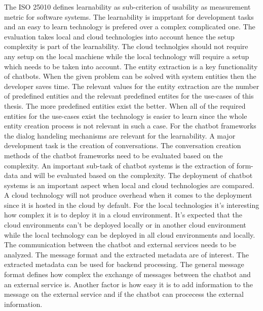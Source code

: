 The ISO 25010\cite{iso25010} defines learnability as sub-criterion of usability as measurement
metric for software systems.
The learnability is impprtant for development tasks and an easy to learn 
technology is prefered over a complex complicated one.
The evaluation takes local and cloud technologies into account hence the 
setup complexity is part of the learnability.
The cloud technolgies should not require any setup on the local machiene while 
the local technology will require a setup which needs to be taken into account.
The entity extraction is a key functionality of chatbots.
When the given problem can be solved with system entities then the developer
saves time.
The relevant values for the entity extraction are the number of predefined entities and 
the relevant predefined entites for the use-cases of this thesis.
The more predefined entities exist the better.
When all of the required entities for the use-cases exist the 
technology is easier to learn since the whole entity creation process is not 
relevant in such a case.
For the chatbot frameworks the dialog handeling mechanisms are relevant for the learnability.
A major development task is the creation of conversations.
The conversation creation methods of the chatbot frameworks need to be evaluated based on the 
complexity.
An important sub-task of chatbot systems is the extraction of form-data and will be evaluated based 
on the complexity.
The deployment of chatbot systems is an important aspect when local and cloud technologies are 
compared.
A cloud technology will not produce overhead when it comes to the deployment since it is 
hosted in the cloud by default.
For the local technologies it's interesting how complex it is to deploy it in a cloud 
environment.
It's expected that the cloud environments can't be deployed locally or in another cloud 
environment while the local technology can be deployed in all cloud environments and locally.
The communication between the chatbot and external services needs to be analyzed.
The message format and the extracted metadata are of interest.
The extracted metadata can be used for backend processing.
The general message format defines how complex the exchange of messages between the 
chatbot and an external service is.
Another factor is how easy it is to add information to the message on the 
external service and if the chatbot can procecess the external information.


